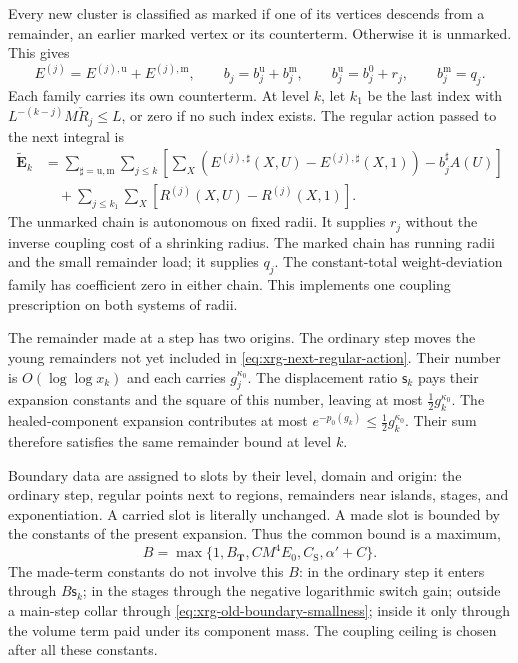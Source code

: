 \documentclass[11pt,letterpaper,reqno]{amsart}
\theoremstyle{definition}
\theoremstyle{remark}
\begin{document}
Every new cluster is classified
as marked if one of its vertices
descends from a remainder, an
earlier marked vertex or its
counterterm. Otherwise it is
unmarked. This gives
\begin{equation}\label{eq:xrg-marked-chain}
 E^{(j)}=E^{(j),\mathrm u}+E^{(j),\mathrm m},
 \qquad b_j=b_j^{\mathrm u}+b_j^{\mathrm m},
 \qquad b_j^{\mathrm u}=b_j^0+r_j,
 \qquad b_j^{\mathrm m}=q_j.
\end{equation}
Each family carries its own
counterterm. At level $k$, let
$k_1$ be the last index with
$L^{-(k-j)}M\check R_j\le L$,
or zero if no such index exists.
The regular action passed to
the next integral is
\begin{equation}\label{eq:xrg-next-regular-action}
 \begin{split}
 \widetilde{\mathbf E}_k
 &=\sum_{\sharp=\mathrm u,\mathrm m}\sum_{j\le k}
       \left[\sum_X(E^{(j),\sharp}(X,U)
                         -E^{(j),\sharp}(X,1))
                                 -b_j^\sharp A(U)\right]\\
 &\quad+\sum_{j\le k_1}\sum_X
                         [R^{(j)}(X,U)-R^{(j)}(X,1)].
 \end{split}
\end{equation}
The unmarked chain is autonomous
on fixed radii. It supplies
$r_j$ without the inverse
coupling cost of a shrinking
radius. The marked chain has
running radii and the small
remainder load; it supplies
$q_j$. The constant-total
weight-deviation family has
coefficient zero in either
chain. This implements one
coupling prescription on both
systems of radii.

The remainder made at a step
has two origins. The ordinary
step moves the young remainders
not yet included in
\eqref{eq:xrg-next-regular-action}.
Their number is
$O(\log\log x_k)$ and each
carries $g_j^{\kappa_0}$.
The displacement ratio
$\mathsf s_k$ pays their
expansion constants and the
square of this number, leaving
at most $\frac12g_k^{\kappa_0}$.
The healed-component expansion
contributes at most
$e^{-p_0(g_k)}\le\frac12g_k^{\kappa_0}$.
Their sum therefore satisfies
the same remainder bound at
level $k$.

Boundary data are assigned to
slots by their level, domain
and origin: the ordinary step,
regular points next to regions,
remainders near islands,
stages, and exponentiation.
A carried slot is literally
unchanged. A made slot is
bounded by the constants of
the present expansion. Thus
the common bound is a maximum,
\[
 B=\max\{1,B_{\mathbf T},CM^4E_0,C_{\mathrm S},\alpha'+C\}.
\]
The made-term constants do
not involve this $B$:
in the ordinary step it
enters through $B\mathsf s_k$;
in the stages through the
negative logarithmic switch
gain; outside a main-step
collar through
\eqref{eq:xrg-old-boundary-smallness};
inside it only through the
volume term paid under its
component mass. The coupling
ceiling is chosen after all
these constants.
\end{document}
